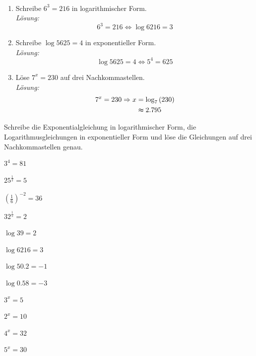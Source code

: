 \documentclass[11pt,oneside]{article}
\begin{document}
	\begin{beispiel}\ \\
		\begin{minipage}[t]{0.32\linewidth}
			\begin{enumerate}[label=\alph*)]
				\item Schreibe $6^3=216$ in logarithmischer Form.\\ \emph{Lösung:}\[6^3=216 \Leftrightarrow \log{6}{216}=3\]
			\end{enumerate}
		\end{minipage}
		\hfill
		\begin{minipage}[t]{0.32\linewidth}
			\begin{enumerate}[label=\alph*)]
				\setcounter{enumi}{1}
				\item Schreibe $\log{5}{625}=4$ in exponentieller Form.\\\emph{Lösung:}\[\log{5}{625}=4 \Leftrightarrow 5^4=625\]
			\end{enumerate}
		\end{minipage}
		\hfill
		\begin{minipage}[t]{0.32\linewidth}
			\begin{enumerate}[label=\alph*)]
				\setcounter{enumi}{2}
				\item Löse $7^x=230$ auf drei Nachkommastellen.\\\emph{Lösung:}
				\begin{align*}
					7^x=230 \Rightarrow x&=\log{7}{230}\\ &\thickapprox 2.795
				\end{align*}
			\end{enumerate}
		\end{minipage}
	\end{beispiel}
	\begin{aufgabe}
		Schreibe die Exponentialgleichung in logarithmischer Form, die Logarithmusgleichungen in exponentieller Form und löse die Gleichungen auf drei Nachkommastellen genau.
		\begin{enumcols}[3]
				\item $3^4=81$ \item $25^\frac{1}{2}=5$ \item $\left(\frac{1}{6}\right)^{-2}=36$ \item $32^\frac{1}{5}=2$
				\item $\log{3}{9}=2$ \item $\log{6}{216}=3$ \item $\log{5}{0.2}=-1$ \item $\log{0.5}{8}=-3$
				\item $3^x=5$ \item $2^x=10$ \item $4^x=32$ \item $5^x=30$
		\end{enumcols}
	\end{aufgabe}
\end{document}
